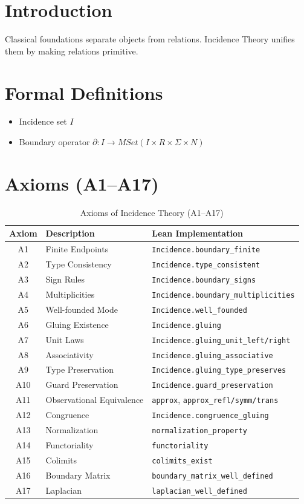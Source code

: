 \documentclass{article}
\begin{document}
\section{Introduction}
Classical foundations separate objects from relations. Incidence Theory unifies them by making relations primitive.

\section{Formal Definitions}
\begin{itemize}
\item Incidence set $I$
\item Boundary operator $\partial: I \to MSet(I \times R \times \Sigma \times N)$
\end{itemize}

\section{Axioms (A1–A17)}
\begin{table}[h]
\centering
\caption{Axioms of Incidence Theory (A1–A17)}
\label{tab:axioms}
\begin{tabular}{|c|l|l|}
\hline
Axiom & Description & Lean Implementation \\
\hline
A1 & Finite Endpoints & \texttt{Incidence.boundary\_finite} \\
A2 & Type Consistency & \texttt{Incidence.type\_consistent} \\
A3 & Sign Rules & \texttt{Incidence.boundary\_signs} \\
A4 & Multiplicities & \texttt{Incidence.boundary\_multiplicities} \\
A5 & Well-founded Mode & \texttt{Incidence.well\_founded} \\
A6 & Gluing Existence & \texttt{Incidence.gluing} \\
A7 & Unit Laws & \texttt{Incidence.gluing\_unit\_left/right} \\
A8 & Associativity & \texttt{Incidence.gluing\_associative} \\
A9 & Type Preservation & \texttt{Incidence.gluing\_type\_preserves} \\
A10 & Guard Preservation & \texttt{Incidence.guard\_preservation} \\
A11 & Observational Equivalence & \texttt{approx}, \texttt{approx\_refl/symm/trans} \\
A12 & Congruence & \texttt{Incidence.congruence\_gluing} \\
A13 & Normalization & \texttt{normalization\_property} \\
A14 & Functoriality & \texttt{functoriality} \\
A15 & Colimits & \texttt{colimits\_exist} \\
A16 & Boundary Matrix & \texttt{boundary\_matrix\_well\_defined} \\
A17 & Laplacian & \texttt{laplacian\_well\_defined} \\
\hline
\end{tabular}
\end{table}
\end{document}
